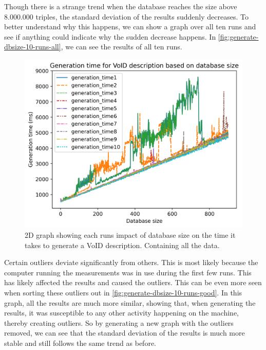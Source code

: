 Though there is a strange trend when the database reaches the size above 8.000.000 triples, the standard deviation of the results suddenly decreases. To better understand why this happens, we can show a graph over all ten runs and see if anything could indicate why the sudden decrease happens. In \autoref{fig:generate-dbsize-10-runs-all}, we can see the results of all ten runs.

\begin{figure}[htb!]
    \centering
    \includegraphics[width=0.8\columnwidth]{figures/generation-results-graph-all.png}
    \caption{2D graph showing each runs impact of database size on the time it takes to generate a VoID description. Containing all the data.}
    \label{fig:generate-dbsize-10-runs-all}
\end{figure}

Certain outliers deviate significantly from others. This is most likely because the computer running the measurements was in use during the first few runs. This has likely affected the results and caused the outliers. This can be even more seen when sorting these outliers out in \autoref{fig:generate-dbsize-10-runs-good}. In this graph, all the results are much more similar, showing that, when generating the results, it was susceptible to any other activity happening on the machine, thereby creating outliers. So by generating a new graph with the outliers removed, we can see that the standard deviation of the results is much more stable and still follows the same trend as before.

